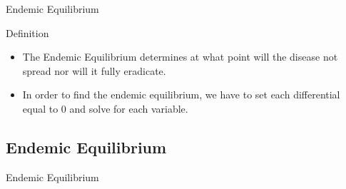 \documentclass{beamer}
\begin{document}
\begin{frame}{Endemic Equilibrium}
    \begin{block}{Definition}
        \begin{itemize}
            \item The Endemic Equilibrium determines at what point will the disease not spread nor will it fully eradicate.
            \item In order to find the endemic equilibrium, we have to set each differential equal to 0 and solve for each variable.
        \end{itemize}
    \end{block}
\end{frame}


\subsection{Endemic Equilibrium}
\begin{frame}{Endemic Equilibrium}
\end{frame}
\end{document}

